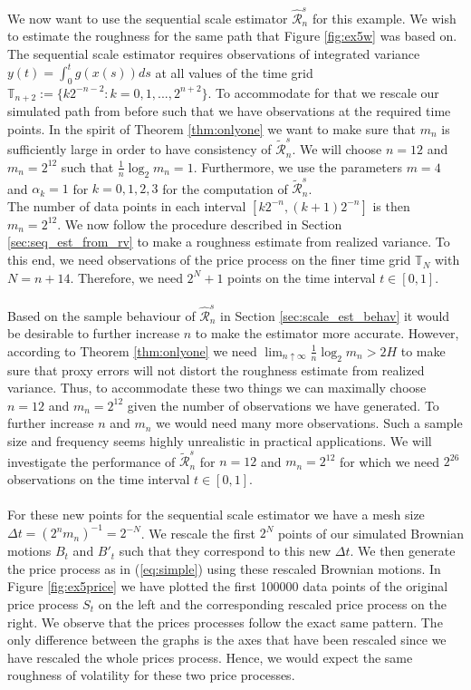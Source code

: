 \documentclass{article}
\begin{document}
We now want to use the sequential scale estimator $\widehat{\mathscr{R}}_n^s $ for this example. We wish to estimate the roughness for the same path that Figure \ref{fig:ex5w} was based on. The sequential scale estimator requires observations of integrated variance $y(t) = \int_0^t g\left(x(s)\right) ds$ at all values of the time grid $\mathbb{T}_{n+2}:= \{k 2^{-n-2} : k=0,1,...,2^{n+2}\}$. To accommodate for that we rescale our simulated path from before such that we have observations at the required time points. In the spirit of Theorem \ref{thm:onlyone} we want to make sure that $m_n$ is sufficiently large in order to have consistency of $\widetilde{\mathscr{R}}_n^s $. We will choose $n=12$ and $m_n=2^{12}$ such that $\frac{1}{n}\log_2 m_n =1$. Furthermore, we use the parameters $m=4$ and $\alpha_k=1$ for $k=0,1,2,3$ for the computation of $\widetilde{\mathscr{R}}_n^s$.\\
The number of data points in each interval $[k2^{-n},(k+1)2^{-n}]$ is then $m_n=2^{12}$. We now follow the procedure described in Section \ref{sec:seq_est_from_rv} to make a roughness estimate from realized variance. To this end, we need observations of the price process on the finer time grid $\mathbb{T}_{N}$ with $N=n+14$. Therefore, we need $2^N+1$ points on the time interval $t\in[0,1]$.\\\\
Based on the sample behaviour of $\widehat{\mathscr{R}}_n^s $ in Section \ref{sec:scale_est_behav} it would be desirable to further increase $n$ to make the estimator more accurate. However, according to Theorem \ref{thm:onlyone} we need $\lim_{n\uparrow \infty} \frac{1}{n}\log_2 m_n >2H$ to make sure that proxy errors will not distort the roughness estimate from realized variance. Thus, to accommodate these two things we can maximally choose $n=12$ and $m_n=2^{12}$ given the number of observations we have generated. To further increase $n$ and $m_n$ we would need many more observations. Such a sample size and frequency seems highly unrealistic in practical applications. We will investigate the performance of $\widetilde{\mathscr{R}}_n^s $ for $n=12$ and $m_n=2^{12}$ for which we need $2^{26}$ observations on the time interval $t\in[0,1]$.\\\\
For these new points for the sequential scale estimator we have a mesh size $\Delta t = (2^n m_n)^{-1} = 2^{-N}$. We rescale the first $2^N$ points of our simulated Brownian motions $B_t$ and $B'_t$ such that they correspond to this new $\Delta t$. We then generate the price process as in (\ref{eq:simple}) using these rescaled Brownian motions. In Figure \ref{fig:ex5price} we have plotted the first 100000 data points of the original price process $S_t$ on the left and the corresponding rescaled price process on the right. We observe that the prices processes follow the exact same pattern. The only difference between the graphs is the axes that have been rescaled since we have rescaled the whole prices process. Hence, we would expect the same roughness of volatility for these two price processes. 
\end{document}
